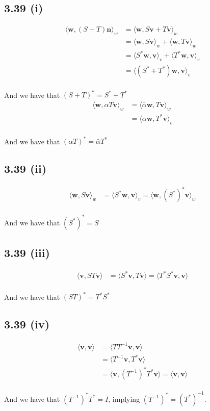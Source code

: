 \documentclass[letterpaper,12pt]{article}
\theoremstyle{definition}
\begin{document}
\subsection*{3.39 (i)}
\begin{align*}
    \langle \mathbf{w}, (S+T)\mathbf{n} \rangle_w &= \langle \mathbf{w}, S\mathbf{v}+T\mathbf{v} \rangle_w \\
    & = \langle \mathbf{w}, S\mathbf{v} \rangle_w + \langle \mathbf{w}, T\mathbf{v} \rangle_w \\
    & = \langle S^*\mathbf{w}, \mathbf{v} \rangle_v +\langle T^*\mathbf{w}, \mathbf{v} \rangle_v \\
    & = \langle (S^* + T^*)\mathbf{w}, \mathbf{v} \rangle_v
\end{align*}\\
And we have that $(S+T)^* = S^* + T^*$
\begin{align*}
    \langle \mathbf{w}, \alpha  T\mathbf{v} \rangle_w &= \langle \bar \alpha \mathbf{w}, T\mathbf{v} \rangle_w \\
    & = \langle \bar \alpha  \mathbf{w}, T^*\mathbf{v} \rangle_v
\end{align*}
\\
And we have that $(\alpha T)^* = \bar \alpha T ^*$\\
\subsection*{3.39 (ii)}
\begin{align*}
    \langle \mathbf{w}, S\mathbf{v} \rangle_w & = \langle S^*\mathbf{w}, \mathbf{v} \rangle_v = \langle \mathbf{w}, (S^*)^*\mathbf{v} \rangle_w
\end{align*}
\\
And we have that $(S^*)^* = S$\\
\subsection*{3.39 (iii)}
\begin{align*}
    \langle \mathbf{v}, ST\mathbf{v} \rangle & = \langle S^*\mathbf{v}, T\mathbf{v} \rangle = \langle T^*S^*\mathbf{v}, \mathbf{v} \rangle 
\end{align*}
\\
And we have that $(ST)^* = T^*S^*$\\
\subsection*{3.39 (iv)}
\begin{align*}
    \langle \mathbf{v}, \mathbf{v} \rangle & = \langle TT^{-1}\mathbf{v}, \mathbf{v} \rangle \\
    & = \langle T^{-1}\mathbf{v}, T^*\mathbf{v} \rangle \\
    & = \langle \mathbf{v}, (T^{-1})^*T^*\mathbf{v} \rangle  = \langle \mathbf{v}, \mathbf{v} \rangle 
\end{align*}\\
And we have that $(T^{-1})^* T^* = I$, implying $(T^{-1})^* = (T^*)^{-1}$.
\end{document}

